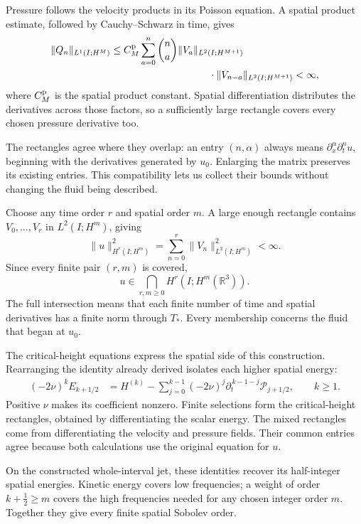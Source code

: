 Pressure follows the velocity products in its Poisson equation. A spatial
product estimate, followed by Cauchy--Schwarz in time, gives
\[
 \begin{aligned}
 \|Q_n\|_{L^1(I;H^M)}
 &\le C_M^{\rm p}\sum_{a=0}^{n}\binom na
       \|V_a\|_{L^2(I;H^{M+1})}\\
 &\hspace{35mm}\cdot\|V_{n-a}\|_{L^2(I;H^{M+1})}<\infty,
 \end{aligned}
\]
where \(C_M^{\rm p}\) is the spatial product constant. Spatial
differentiation distributes the derivatives across those factors, so a
sufficiently large rectangle covers every chosen pressure derivative too.

The rectangles agree where they overlap: an entry \((n,\alpha)\)
always means \(\partial_x^\alpha\partial_t^nu\), beginning with the
derivatives generated by \(u_0\). Enlarging the matrix preserves its
existing entries. This compatibility lets us collect their bounds without
changing the fluid being described.

Choose any time order \(r\) and spatial order \(m\). A large enough
rectangle contains \(V_0,\ldots,V_r\) in \(L^2(I;H^m)\), giving
\[
 \|u\|_{H^r(I;H^m)}^2
 =\sum_{n=0}^{r}\|V_n\|_{L^2(I;H^m)}^2<\infty.
\]
Since every finite pair \((r,m)\) is covered,
\[
 u\in\bigcap_{r,m\ge0}H^r(I;H^m(\mathbb R^3)).
\]
The full intersection means that each finite number of time and spatial
derivatives has a finite norm through \(T_*\). Every membership concerns
the fluid that began at \(u_0\).

\label{u:guide:mixed-jet-map}
The critical-height equations express the spatial side of this construction.
Rearranging the identity already derived isolates each higher spatial energy:
\[
 \begin{aligned}
 (-2\nu)^k E_{k+1/2}
 &=H^{(k)}
   -\sum_{j=0}^{k-1}(-2\nu)^j
       \partial_t^{\,k-1-j}\mathcal P_{j+1/2},
 \qquad k\ge1.
 \end{aligned}
\]
Positive \(\nu\) makes its coefficient nonzero. Finite selections form
the critical-height rectangles, obtained by differentiating the scalar
energy. The mixed rectangles come from differentiating the velocity and
pressure fields. Their common entries agree because both calculations
use the original equation for \(u\).

On the constructed whole-interval jet, these identities recover its
half-integer spatial energies. Kinetic energy covers low frequencies;
a weight of order \(k+\tfrac12\ge m\) covers the high frequencies
needed for any chosen integer order \(m\). Together they give every
finite spatial Sobolev order.

